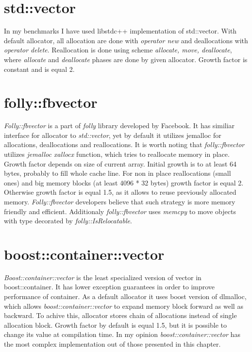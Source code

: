 \documentclass[inz, english, shortabstract]{iithesis}
\begin{document}
\section{std::vector}
In my benchmarks I have used libstdc++ implementation\cite{std::vector_impl} of std::vector. With default allocator, all allocation are done with {\it operator new} and deallocations with {\it operator delete}. Reallocation is done using scheme {\it allocate, move, deallocate}, where {\it allocate} and {\it  deallocate} phases are done by given allocator. Growth factor is constant and is equal 2.

\section{folly::fbvector}
{\it Folly::fbvector}\cite{folly::fbvector_impl} is a part of {\it folly} library developed by Facebook. It has similiar interface for allocator to {\it std::vector}, yet by default it utilizes jemalloc for allocations, deallocations and reallocations\cite{folly::fbvector_description}. It is worth noting that {\it folly::fbvector} utilizes {\it jemalloc xallocx} function, which tries to reallocate memory in place. Growth factor depends on size of current array. Initial growth is to at least 64 bytes, probably to fill whole cache line. For non in place reallocations (small ones) and big memory blocks (at least 4096 * 32 bytes) growth factor is equal 2. Otherwise growth factor is equal 1.5, as it allows to reuse previously allocated memory. {\it Folly::fbvector} developers believe that such strategy is more memory friendly and efficient\cite{folly::fbvector_description}. Additionaly {\it folly::fbvector} uses {\it memcpy} to move objects with type decorated by {\it folly::IsRelocatable}.

\section{boost::container::vector}
{\it Boost::container::vector}\cite{boost::container::vector_impl} is the least specialized version of vector in {boost::container}. It has lower exception guarantees in order to improve performance of container\cite{boost_exceptions}. As a default allocator it uses boost version of dlmalloc\cite{dlmalloc}, which allows {\it boost::container::vector} to expand memory block forward as well as backward. To achive this, allocator stores chain of allocations instead of single allocation block. Growth factor by default is equal 1.5, but it is possible to change its value at compilation time. In my opinion {\it boost::container::vector} has the most complex implementation out of those presented in this chapter.
\end{document}
